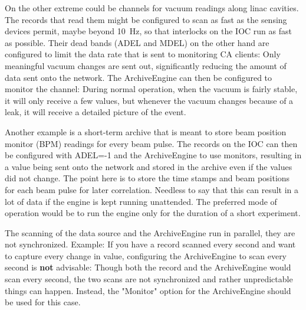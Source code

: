 On the other extreme could be channels for vacuum readings along linac
cavities. The records that read them might be configured to scan as
fast as the sensing devices permit, maybe beyond 10~Hz, so that
interlocks on the IOC run as fast as possible. Their dead bands (ADEL
and MDEL) on the other hand are configured to limit the data rate that
is sent to monitoring CA clients: Only meaningful vacuum changes are
sent out, significantly reducing the amount of data sent onto the
network.  The ArchiveEngine can then be configured to monitor the
channel: During normal operation, when the vacuum is fairly stable, it
will only receive a few values, but whenever the vacuum changes
because of a leak, it will receive a detailed picture of the event.

Another example is a short-term archive that is meant to store
beam position monitor (BPM) readings for every beam pulse. The records
on the IOC can then be configured with ADEL=-1 and the ArchiveEngine
to use monitors, resulting in a value being sent onto the network and
stored in the archive even if the values did not change. The point
here is to store the time stamps and beam positions for each beam
pulse for later correlation. Needless to say that this can result in a
lot of data if the engine is kept running unattended. The preferred
mode of operation would be to run the engine only for the duration
of a short experiment.

\NOTE The scanning of the data source and the ArchiveEngine run in
parallel, they are not synchronized.
Example: If you have a record scanned every second and want to capture
every change in value, configuring the ArchiveEngine to scan every
second is {\bfseries not} advisable:
Though both the record and the ArchiveEngine would scan every
second, the two scans are not synchronized and rather unpredictable
things can happen. Instead, the "Monitor" option for the ArchiveEngine
should be used for this case.
